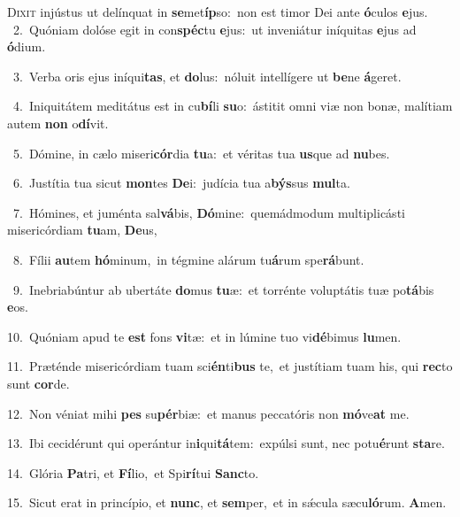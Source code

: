 \lettrine{\initial\textcolor{\initialcolor}{D}}{ixit} injústus ut delínquat in \textbf{se}\-met\-\textbf{íp}\-so:~\star non est timor Dei ante \textbf{ó}\-culos \textbf{e}\-jus.\\
{\numbfont\textcolor{\numbcolor}{~2.}}~Quóniam dolóse egit in con\-\textbf{spéc}\-tu \textbf{e}\-jus:~\star ut inveniátur iníquitas \textbf{e}\-jus ad \textbf{ó}\-dium.\par
{\numbfont\textcolor{\numbcolor}{~3.}}~Verba oris ejus iníqui\-\textbf{tas}\-, et \textbf{do}\-lus:~\star nóluit intellígere ut \textbf{be}\-ne \textbf{á}\-geret.\par
{\numbfont\textcolor{\numbcolor}{~4.}}~Iniquitátem meditátus est in cu\-\textbf{bí}\-li \textbf{su}\-o:~\star ástitit omni viæ non bonæ, malítiam autem \textbf{non} o\-\textbf{dí}\-vit.\par
{\numbfont\textcolor{\numbcolor}{~5.}}~Dómine, in cælo miseri\-\textbf{cór}\-dia \textbf{tu}\-a:~\star et véritas tua \textbf{us}\-que ad \textbf{nu}\-bes.\par
{\numbfont\textcolor{\numbcolor}{~6.}}~Justítia tua sicut \textbf{mon}\-tes \textbf{De}\-i:~\star judícia tua a\-\textbf{býs}\-sus \textbf{mul}\-ta.\par
{\numbfont\textcolor{\numbcolor}{~7.}}~Hómines, et juménta sal\-\textbf{vá}\-bis, \textbf{Dó}\-mine:~\star quemádmodum multiplicásti misericórdiam \textbf{tu}\-am, \textbf{De}\-us,\par
{\numbfont\textcolor{\numbcolor}{~8.}}~Fílii \textbf{au}\-tem \textbf{hó}\-minum,~\star in tégmine alárum tu\-\textbf{á}\-rum spe\-\textbf{rá}\-bunt.\par
{\numbfont\textcolor{\numbcolor}{~9.}}~Inebriabúntur ab ubertáte \textbf{do}\-mus \textbf{tu}\-æ:~\star et torrénte voluptátis tuæ po\-\textbf{tá}\-bis \textbf{e}\-os.\par
{\numbfont\textcolor{\numbcolor}{10.}}~Quóniam apud te \textbf{est} fons \textbf{vi}\-tæ:~\star et in lúmine tuo vi\-\textbf{dé}\-bimus \textbf{lu}\-men.\par
{\numbfont\textcolor{\numbcolor}{11.}}~Præténde misericórdiam tuam sci\-\textbf{én}\-ti\textbf{bus} te,~\star et justítiam tuam his, qui \textbf{rec}\-to sunt \textbf{cor}\-de.\par
{\numbfont\textcolor{\numbcolor}{12.}}~Non véniat mihi \textbf{pes} su\-\textbf{pér}\-biæ:~\star et manus peccatóris non \textbf{mó}\-ve\textbf{at} me.\par
{\numbfont\textcolor{\numbcolor}{13.}}~Ibi cecidérunt qui operántur in\-\textbf{i}\-qui\-\textbf{tá}\-tem:~\star expúlsi sunt, nec potu\-\textbf{é}\-runt \textbf{sta}\-re.\par
{\numbfont\textcolor{\numbcolor}{14.}}~Glória \textbf{Pa}\-tri, et \textbf{Fí}\-lio,~\star et Spi\-\textbf{rí}\-tui \textbf{Sanc}\-to.\par
{\numbfont\textcolor{\numbcolor}{15.}}~Sicut erat in princípio, et \textbf{nunc}\-, et \textbf{sem}\-per,~\star et in sǽcula sæcu\-\textbf{ló}\-rum. \textbf{A}\-men.\par
